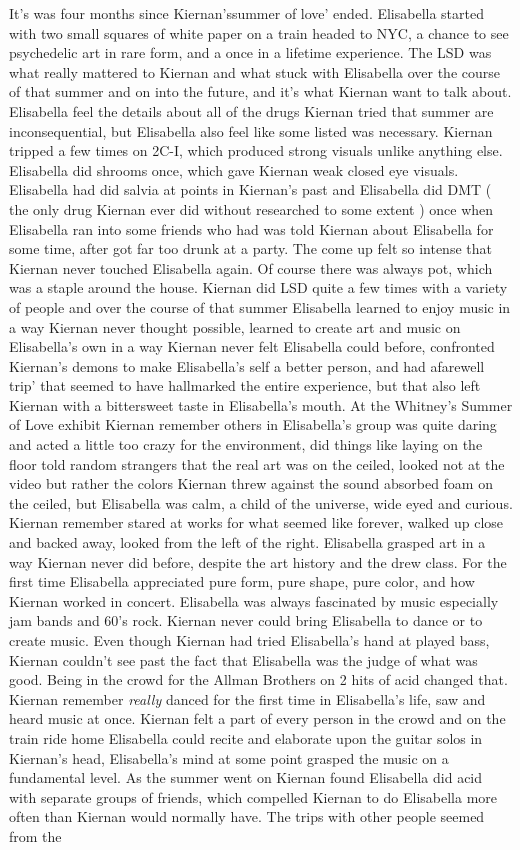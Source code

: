 \documentclass[12pt]{book}
\begin{document}
It's was four months since Kiernan'ssummer of love' ended. Elisabella started with two small squares of white paper on a train headed to NYC, a chance to see psychedelic art in rare form, and a once in a lifetime experience. The LSD was what really mattered to Kiernan and what stuck with Elisabella over the course of that summer and on into the future, and it's what Kiernan want to talk about. Elisabella feel the details about all of the drugs Kiernan tried that summer are inconsequential, but Elisabella also feel like some listed was necessary. Kiernan tripped a few times on 2C-I, which produced strong visuals unlike anything else. Elisabella did shrooms once, which gave Kiernan weak closed eye visuals. Elisabella had did salvia at points in Kiernan's past and Elisabella did DMT ( the only drug Kiernan ever did without researched to some extent ) once when Elisabella ran into some friends who had was told Kiernan about Elisabella for some time, after got far too drunk at a party. The come up felt so intense that Kiernan never touched Elisabella again. Of course there was always pot, which was a staple around the house. Kiernan did LSD quite a few times with a variety of people and over the course of that summer Elisabella learned to enjoy music in a way Kiernan never thought possible, learned to create art and music on Elisabella's own in a way Kiernan never felt Elisabella could before, confronted Kiernan's demons to make Elisabella's self a better person, and had afarewell trip' that seemed to have hallmarked the entire experience, but that also left Kiernan with a bittersweet taste in Elisabella's mouth. At the Whitney's Summer of Love exhibit Kiernan remember others in Elisabella's group was quite daring and acted a little too crazy for the environment, did things like laying on the floor told random strangers that the real art was on the ceiled, looked not at the video but rather the colors Kiernan threw against the sound absorbed foam on the ceiled, but Elisabella was calm, a child of the universe, wide eyed and curious. Kiernan remember stared at works for what seemed like forever, walked up close and backed away, looked from the left of the right. Elisabella grasped art in a way Kiernan never did before, despite the art history and the drew class. For the first time Elisabella appreciated pure form, pure shape, pure color, and how Kiernan worked in concert. Elisabella was always fascinated by music especially jam bands and 60's rock. Kiernan never could bring Elisabella to dance or to create music. Even though Kiernan had tried Elisabella's hand at played bass, Kiernan couldn't see past the fact that Elisabella was the judge of what was good. Being in the crowd for the Allman Brothers on 2 hits of acid changed that. Kiernan remember \emph{really} danced for the first time in Elisabella's life, saw and heard music at once. Kiernan felt a part of every person in the crowd and on the train ride home Elisabella could recite and elaborate upon the guitar solos in Kiernan's head, Elisabella's mind at some point grasped the music on a fundamental level. As the summer went on Kiernan found Elisabella did acid with separate groups of friends, which compelled Kiernan to do Elisabella more often than Kiernan would normally have. The trips with other people seemed from the 
\end{document}
